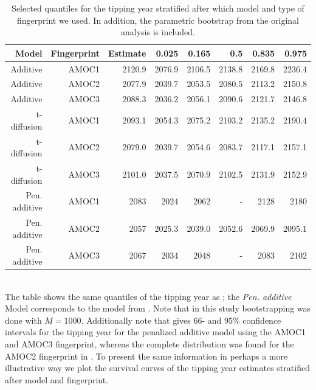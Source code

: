\begin{table}[ht]
    \centering
    \begin{tabular}{rrrrrrrr}
    Model & Fingerprint & Estimate    & 0.025  & 0.165  & 0.5    & 0.835  & 0.975 \\ 
      \hline
    Additive & AMOC1 & 2120.9         & 2076.9 & 2106.5 & 2138.8 & 2169.8 & 2236.4 \\
    Additive & AMOC2 & 2077.9         & 2039.7 & 2053.5 & 2080.5 & 2113.2 & 2150.8 \\ 
    Additive & AMOC3 & 2088.3         & 2036.2 & 2056.1 & 2090.6 & 2121.7 & 2146.8 \\ \hline 
    t-diffusion & AMOC1 & 2093.1      & 2054.3 & 2075.2 & 2103.2 & 2135.2 & 2190.4 \\ 
    t-diffusion & AMOC2 & 2079.0      & 2039.7 & 2054.6 & 2083.7 & 2117.1 & 2157.1 \\ 
    t-diffusion & AMOC3 & 2101.0      & 2037.5 & 2070.9 & 2102.5 & 2131.9 & 2152.9 \\ 
    \hline 
    Pen. additive& AMOC1 & 2083       & 2024 & 2062 & - & 2128 & 2180 \\
    Pen. additive& AMOC2 & 2057       & 2025.3 & 2039.0 & 2052.6 & 2069.9 & 2095.1 \\ 
    Pen. additive& AMOC3 & 2067       & 2034 & 2048 & - & 2083 & 2102 \\
       \hline
    \end{tabular}
    \caption{Selected quantiles for the tipping year stratified after which model and type of fingerprint we used. In addition, the parametric bootstrap from the original analysis \cite{Ditlevsen2023} is included.}
    \label{table:tipping_quantiles}
\end{table}\\
The table shows the same quantiles of the tipping year as \cite{DitlevsenSupplementary}; the \textit{Pen. additive} Model corresponds to the model from \cite{Ditlevsen2023}. Note that in this study bootstrapping was done with $M = 1000$. Additionally note that \cite[Table 1]{Ditlevsen2023} gives $66$- and $95\%$ confidence intervals for the tipping year for the penalized additive model using the AMOC1 and AMOC3 fingerprint, whereas the complete distribution was found for the AMOC2 fingerprint in \cite{DitlevsenSupplementary}.\newpage 
\noindent To present the same information in perhaps a more illustrative way we plot the survival curves of the tipping year estimates stratified after model and fingerprint.
